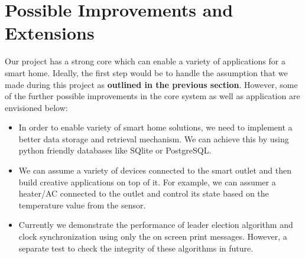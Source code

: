 \documentclass[12pt]{article}
\begin{document}
\section{Possible Improvements and Extensions}
Our project has a strong core which can enable a variety of applications for a smart home. Ideally, the first step would be to handle the assumption that we made during this project as 
\textbf{outlined in the previous section}. However,  some of the further possible improvements in the core system as well as application are envisioned below: 

\begin{itemize}
	\item In order to enable variety of smart home solutions, we need to implement a better 
	data storage and retrieval mechanism. We can achieve this by using python friendly databases
	like SQlite or PostgreSQL. 
	
	\item We can assume a variety of devices connected to the smart outlet and then build creative applications on top of it. For example, we can assumer a heater/AC connected to the 
	outlet and control its state based on the temperature value from the sensor.
	
	\item Currently we demonstrate the performance of leader election algorithm and clock 
	synchronization using only the on screen print messages. However, a separate test to check the integrity of these algorithms in future. 
	
	
\end{itemize}
\end{document}
